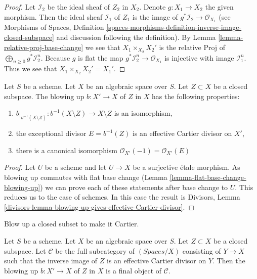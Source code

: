 \begin{proof}
Let $\mathcal{I}_2$ be the ideal sheaf of $Z_2$ in $X_2$.
Denote $g : X_1 \to X_2$ the given morphism. Then the ideal sheaf
$\mathcal{I}_1$ of $Z_1$ is the image of
$g^*\mathcal{I}_2 \to \mathcal{O}_{X_1}$
(see Morphisms of Spaces, Definition
\ref{spaces-morphisms-definition-inverse-image-closed-subspace}
and discussion following the definition).
By Lemma \ref{lemma-relative-proj-base-change}
we see that $X_1 \times_{X_2} X_2'$ is the relative Proj of
$\bigoplus_{n \geq 0} g^*\mathcal{I}_2^n$. Because $g$ is flat the map
$g^*\mathcal{I}_2^n \to \mathcal{O}_{X_1}$ is injective with image
$\mathcal{I}_1^n$. Thus we see that $X_1 \times_{X_2} X_2' = X_1'$.
\end{proof}

\begin{lemma}
\label{lemma-blowing-up-gives-effective-Cartier-divisor}
Let $S$ be a scheme. Let $X$ be an algebraic space over $S$.
Let $Z \subset X$ be a closed subspace.
The blowing up $b : X' \to X$ of $Z$ in $X$
has the following properties:
\begin{enumerate}
\item $b|_{b^{-1}(X \setminus Z)} : b^{-1}(X \setminus Z) \to X \setminus Z$
is an isomorphism,
\item the exceptional divisor $E = b^{-1}(Z)$ is an effective Cartier divisor
on $X'$,
\item there is a canonical isomorphism
$\mathcal{O}_{X'}(-1) = \mathcal{O}_{X'}(E)$
\end{enumerate}
\end{lemma}

\begin{proof}
Let $U$ be a scheme and let $U \to X$ be a surjective \'etale morphism.
As blowing up commutes with flat base change
(Lemma \ref{lemma-flat-base-change-blowing-up})
we can prove each of these statements after base change to $U$.
This reduces us to the case of schemes.
In this case the result is
Divisors, Lemma
\ref{divisors-lemma-blowing-up-gives-effective-Cartier-divisor}.
\end{proof}

\begin{lemma}
\label{lemma-universal-property-blowing-up}
\begin{slogan}
Blow up a closed subset to make it Cartier.
\end{slogan}
Let $S$ be a scheme.
Let $X$ be an algebraic space over $S$.
Let $Z \subset X$ be a closed subspace.
Let $\mathcal{C}$ be the full subcategory of $(\textit{Spaces}/X)$ consisting
of $Y \to X$ such that the inverse image of $Z$ is an effective
Cartier divisor on $Y$. Then the blowing up $b : X' \to X$ of $Z$ in $X$
is a final object of $\mathcal{C}$.
\end{lemma}

